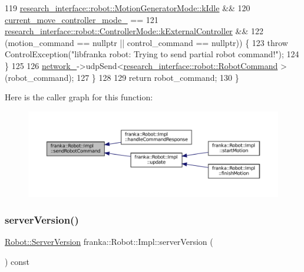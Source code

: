 \begin{DoxyCode}
119             \hyperlink{namespaceresearch__interface_1_1robot_abd2451eb963a1843f1eb066ebd4b06e8af5137a026a4b2f3b1c8a21cfc60dd14b}{research\_interface::robot::MotionGeneratorMode::kIdle}
       &&
120         \hyperlink{classfranka_1_1Robot_1_1Impl_ab5d1a7e855dae2453635da08440c375e}{current\_move\_controller\_mode\_} ==
121             \hyperlink{namespaceresearch__interface_1_1robot_a54ee0c8bfefd2ee8a46837ca6d2b1213aae18ec698c6d2260b411166de51e86fe}{research\_interface::robot::ControllerMode::kExternalController}
       &&
122         (motion\_command == \textcolor{keyword}{nullptr} || control\_command == \textcolor{keyword}{nullptr})) \{
123       \textcolor{keywordflow}{throw} ControlException(\textcolor{stringliteral}{"libfranka robot: Trying to send partial robot command!"});
124     \}
125 
126     \hyperlink{classfranka_1_1Robot_1_1Impl_acecf3b158ccd1c2ed7e76971f1e6a192}{network\_}->udpSend<\hyperlink{structresearch__interface_1_1robot_1_1RobotCommand}{research\_interface::robot::RobotCommand}
      >(robot\_command);
127   \}
128 
129   \textcolor{keywordflow}{return} robot\_command;
130 \}
\end{DoxyCode}
Here is the caller graph for this function\+:
\nopagebreak
\begin{figure}[H]
\begin{center}
\leavevmode
\includegraphics[width=350pt]{classfranka_1_1Robot_1_1Impl_a4c927a26f2a6eceb352ce3af49d28c37_icgraph}
\end{center}
\end{figure}
\mbox{\label{classfranka_1_1Robot_1_1Impl_af10ccd204c0d2f1c3ad5b7fd4f72be92}} 
\subsubsection{\texorpdfstring{server\+Version()}{serverVersion()}}
{\footnotesize\ttfamily \hyperlink{classfranka_1_1Robot_ad1dd3dccff6f33691d2c66eaa5ac5a10}{Robot\+::\+Server\+Version} franka\+::\+Robot\+::\+Impl\+::server\+Version (\begin{DoxyParamCaption}{ }\end{DoxyParamCaption}) const\hspace{0.3cm}{\ttfamily [noexcept]}}



